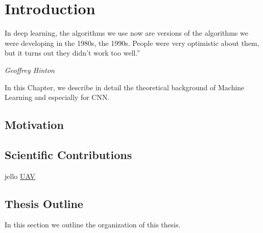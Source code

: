 
\newcommand{\keyword}[1]{\textbf{#1}}
\newcommand{\tabhead}[1]{\textbf{#1}}
\newcommand{\code}[1]{\texttt{#1}}
\newcommand{\file}[1]{\texttt{\bfseries#1}}
\newcommand{\option}[1]{\texttt{\itshape#1}}
\setlength{\parindent}{4ex}


\chapter{Introduction} %

\label{Chapter1} %

\epigraph{In deep learning, the algorithms we use now are versions of the algorithms we were developing in the 1980s, the 1990s. People were very optimistic about them, but it turns out they didn't work too well.” }{\textit{Geoffrey Hinton}}

\par In this Chapter, we describe in detail the theoretical background of Machine Learning and especially for CNN.
\par 





\par 

\section{Motivation} 
\par \cite{Reference42}

\section{Scientific Contributions}
     
\par 
jello \hyperref[abbr:UAV]{UAV}

\section{Thesis Outline}
In this section we outline the organization of this thesis.\newline

